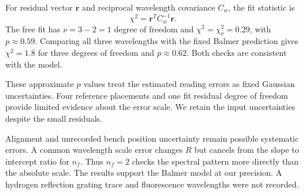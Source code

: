 For residual vector $\mathbf r$ and reciprocal wavelength covariance $C_w$, the fit statistic is
\begin{equation}
\chi^2=\mathbf r^{T}C_w^{-1}\mathbf r.
\end{equation}
The free fit has $\nu=3-2=1$ degree of freedom and $\chi^2=\chi_\nu^2=0.29$, with $p\approx0.59$. Comparing all three wavelengths with the fixed Balmer prediction gives $\chi^2=1.8$ for three degrees of freedom and $p\approx0.62$. Both checks are consistent with the model.

These approximate $p$ values treat the estimated reading errors as fixed Gaussian uncertainties. Four reference placements and one fit residual degree of freedom provide limited evidence about the error scale. We retain the input uncertainties despite the small residuals.

Alignment and unrecorded bench position uncertainty remain possible systematic errors. A common wavelength scale error changes $R$ but cancels from the slope to intercept ratio for $n_f$. Thus $n_f=2$ checks the spectral pattern more directly than the absolute scale. The results support the Balmer model at our precision. A hydrogen reflection grating trace and fluorescence wavelengths were not recorded.
